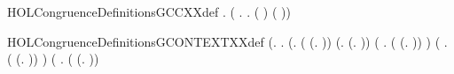 \newcommand{\HOLCongruenceDefinitionsCONTEXTXXdef}{\UseVerbatim{HOLCongruenceDefinitionsCONTEXTXXdef}}
\begin{SaveVerbatim}{HOLCongruenceDefinitionsGCCXXdef}
\HOLTokenTurnstile{} \HOLSymConst{\HOLTokenForall{}}.   \HOLSymConst{=} (\HOLTokenLambda{} . \HOLSymConst{\HOLTokenForall{}}.   \HOLSymConst{\HOLTokenImp{}}  ( ) ( ))
\end{SaveVerbatim}
\newcommand{\HOLCongruenceDefinitionsGCCXXdef}{\UseVerbatim{HOLCongruenceDefinitionsGCCXXdef}}
\begin{SaveVerbatim}{HOLCongruenceDefinitionsGCONTEXTXXdef}
\HOLTokenTurnstile{}  \HOLSymConst{=}
   (\HOLTokenLambda{}.
        \HOLSymConst{\HOLTokenForall{}}.
            (\HOLSymConst{\HOLTokenForall{}}.
                 ( \HOLSymConst{=} (\HOLTokenLambda{}. )) \HOLSymConst{\HOLTokenDisj{}} (\HOLSymConst{\HOLTokenExists{}}.  \HOLSymConst{=} (\HOLTokenLambda{}. )) \HOLSymConst{\HOLTokenDisj{}}
                 (\HOLSymConst{\HOLTokenExists{}} . ( \HOLSymConst{=} (\HOLTokenLambda{}.  )) \HOLSymConst{\HOLTokenConj{}}  ) \HOLSymConst{\HOLTokenDisj{}}
                 (\HOLSymConst{\HOLTokenExists{}}   .
                      ( \HOLSymConst{=} (\HOLTokenLambda{}.   \HOLSymConst{+}  )) \HOLSymConst{\HOLTokenConj{}}
                        \HOLSymConst{\HOLTokenConj{}}  ) \HOLSymConst{\HOLTokenDisj{}}
                 (\HOLSymConst{\HOLTokenExists{}} .
                      ( \HOLSymConst{=} (\HOLTokenLambda{}.   \HOLSymConst{\ensuremath{\parallel}}  )) \HOLSymConst{\HOLTokenConj{}}   \HOLSymConst{\HOLTokenConj{}}

\end{SaveVerbatim}
